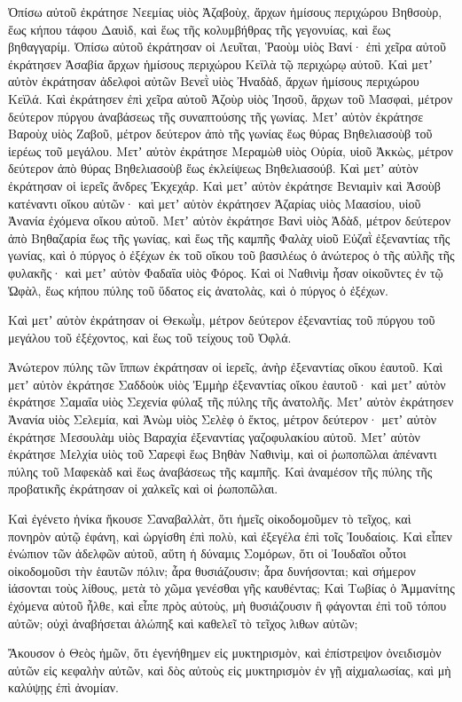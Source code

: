 {Ὀπίσω αὐτοῦ ἐκράτησε Νεεμίας υἱὸς Ἀζαβοὺχ, ἄρχων ἡμίσους περιχώρου Βηθσοὺρ, ἕως κήπου τάφου Δαυὶδ, καὶ ἕως τῆς κολυμβήθρας τῆς γεγονυίας, καὶ ἕως βηθαγγαρίμ.
Ὀπίσω αὐτοῦ ἐκράτησαν οἱ Λευῖται, Ῥαοὺμ υἱὸς Βανί· ἐπὶ χεῖρα αὐτοῦ ἐκράτησεν Ἀσαβία ἄρχων ἡμίσους περιχώρου Κεϊλὰ τῷ περιχώρῳ αὐτοῦ.
Καὶ μετʼ αὐτὸν ἐκράτησαν ἀδελφοὶ αὐτῶν Βενεῒ υἱὸς Ἠναδὰδ, ἄρχων ἡμίσους περιχώρου Κεϊλά.
Καὶ ἐκράτησεν ἐπὶ χεῖρα αὐτοῦ Ἀζοὺρ υἱὸς Ἰησοῦ, ἄρχων τοῦ Μασφαὶ, μέτρον δεύτερον πύργου ἀναβάσεως τῆς συναπτούσης τῆς γωνίας.
Μετʼ αὐτὸν ἐκράτησε Βαροὺχ υἱὸς Ζαβοῦ, μέτρον δεύτερον ἀπὸ τῆς γωνίας ἕως θύρας Βηθελιασοὺβ τοῦ ἱερέως τοῦ μεγάλου.
Μετʼ αὐτὸν ἐκράτησε Μεραμὼθ υἱὸς Οὐρία, υἱοῦ Ἀκκὼς, μέτρον δεύτερον ἀπὸ θύρας Βηθελιασοὺβ ἕως ἐκλείψεως Βηθελιασούβ.
Καὶ μετʼ αὐτὸν ἐκράτησαν οἱ ἱερεῖς ἄνδρες Ἐκχεχάρ.
Καὶ μετʼ αὐτὸν ἐκράτησε Βενιαμὶν καὶ Ἀσοὺβ κατέναντι οἴκου αὐτῶν· καὶ μετʼ αὐτὸν ἐκράτησεν Ἀζαρίας υἱὸς Μαασίου, υἱοῦ Ἀνανία ἐχόμενα οἴκου αὐτοῦ.
Μετʼ αὐτὸν ἐκράτησε Βανὶ υἱὸς Ἀδὰδ, μέτρον δεύτερον ἀπὸ
Βηθαζαρία ἕως τῆς γωνίας, καὶ ἕως τῆς καμπῆς Φαλὰχ υἱοῦ Εὐζαῒ ἐξεναντίας τῆς γωνίας, καὶ ὁ πύργος ὁ ἐξέχων ἐκ τοῦ οἴκου τοῦ βασιλέως ὁ ἀνώτερος ὁ τῆς αὐλῆς τῆς φυλακῆς· καὶ μετʼ αὐτὸν Φαδαΐα υἱὸς Φόρος.
Καὶ οἱ Ναθινὶμ ἦσαν οἰκοῦντες ἐν τῷ Ὠφὰλ, ἕως κήπου πύλης τοῦ ὕδατος εἰς ἀνατολὰς, καὶ ὁ πύργος ὁ ἐξέχων.
\par }{\PP {}Καὶ μετʼ αὐτὸν ἐκράτησαν οἱ Θεκωῒμ, μέτρον δεύτερον ἐξεναντίας τοῦ πύργου τοῦ μεγάλου τοῦ ἐξέχοντος, καὶ ἕως τοῦ τείχους τοῦ Ὀφλά.
\par }{\PP {}Ἀνώτερον πύλης τῶν ἵππων ἐκράτησαν οἱ ἱερεῖς, ἀνὴρ ἐξεναντίας οἴκου ἑαυτοῦ.
Καὶ μετʼ αὐτὸν ἐκράτησε Σαδδοὺκ υἱὸς Ἐμμὴρ ἐξεναντίας οἴκου ἑαυτοῦ· καὶ μετʼ αὐτὸν ἐκράτησε Σαμαΐα υἱὸς Σεχενία φύλαξ τῆς πύλης τῆς ἀνατολῆς.
Μετʼ αὐτὸν ἐκράτησεν Ἀνανία υἱὸς Σελεμία, καὶ Ἀνὼμ υἱὸς Σελὲφ ὁ ἕκτος, μέτρον δεύτερον· μετʼ αὐτὸν ἐκράτησε Μεσουλὰμ υἱὸς Βαραχία ἐξεναντίας γαζοφυλακίου αὐτοῦ.
Μετʼ αὐτὸν ἐκράτησε Μελχία υἱὸς τοῦ Σαρεφὶ ἕως Βηθὰν Ναθινὶμ, καὶ οἱ ῥωποπῶλαι ἀπέναντι πύλης τοῦ Μαφεκὰδ καὶ ἕως ἀναβάσεως τῆς καμπῆς.
Καὶ ἀναμέσον τῆς πύλης τῆς προβατικῆς ἐκράτησαν οἱ χαλκεῖς καὶ οἱ ῥωποπῶλαι.
\par }{\PP {}Καὶ ἐγένετο ἡνίκα ἤκουσε Σαναβαλλὰτ, ὅτι ἡμεῖς οἰκοδομοῦμεν τὸ τεῖχος, καὶ πονηρὸν αὐτῷ ἐφάνη, καὶ ὠργίσθη ἐπὶ πολὺ, καὶ ἐξεγέλα ἐπὶ τοῖς Ἰουδαίοις.
Καὶ εἶπεν ἐνώπιον τῶν ἀδελφῶν αὐτοῦ, αὕτη ἡ δύναμις Σομόρων, ὅτι οἱ Ἰουδαῖοι οὗτοι οἰκοδομοῦσι τὴν ἑαυτῶν πόλιν; ἆρα θυσιάζουσιν; ἆρα δυνήσονται; καὶ σήμερον ἰάσονται τοὺς λίθους, μετὰ τὸ χῶμα γενέσθαι γῆς καυθέντας;
Καὶ Τωβίας ὁ Ἀμμανίτης ἐχόμενα αὐτοῦ ἦλθε, καὶ εἶπε πρὸς αὐτοὺς, μὴ θυσιάζουσιν ἢ φάγονται ἐπὶ τοῦ τόπου αὐτῶν; οὐχὶ ἀναβήσεται ἀλώπηξ καὶ καθελεῖ τὸ τεῖχος λιθων αὐτῶν;
\par }{\PP {}Ἄκουσον ὁ Θεὸς ἡμῶν, ὅτι ἐγενήθημεν εἰς μυκτηρισμὸν, καὶ ἐπίστρεψον ὀνειδισμὸν αὐτῶν εἰς κεφαλὴν αὐτῶν, καὶ δὸς αὐτοὺς εἰς μυκτηρισμὸν ἐν γῇ αἰχμαλωσίας,
καὶ μὴ καλύψῃς ἐπὶ ἀνομίαν.

}
